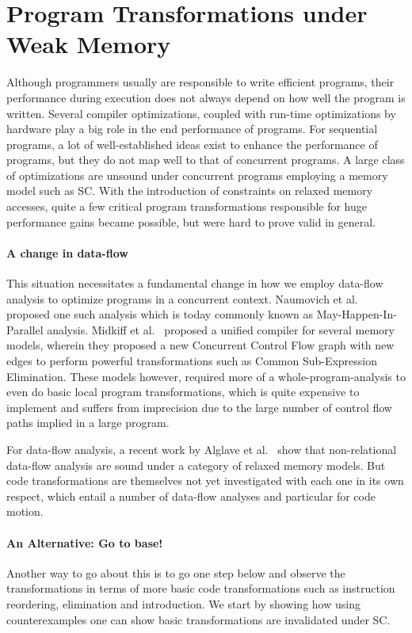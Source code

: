 \section{Program Transformations under Weak Memory}

    Although programmers usually are responsible to write efficient programs, their performance during execution does not always depend on how well the program is written. 
    Several compiler optimizations, coupled with run-time optimizations by hardware play a big role in the end performance of programs.
    For sequential programs, a lot of well-established ideas exist to enhance the performance of programs, but they do not map well to that of concurrent programs. 
    A large class of optimizations are unsound under concurrent programs employing a memory model such as SC.
    With the introduction of constraints on relaxed memory accesses, quite a few critical program transformations responsible for huge performance gains became possible, but were hard to prove valid in general. 

    \paragraph{A change in data-flow} 
    This situation necessitates a fundamental change in how we employ data-flow analysis to optimize programs in a concurrent context. Naumovich et al.~\cite{NaumovichA} proposed one such analysis which is today commonly known as May-Happen-In-Parallel analysis. 
    Midkiff et al.~\cite{Midkiff} proposed a unified compiler for several memory models, wherein they proposed a new Concurrent Control Flow graph with new edges to perform powerful transformations such as Common Sub-Expression Elimination. 
    These models however, required more of a whole-program-analysis to even do basic local program transformations, which is quite expensive to implement and suffers from imprecision due to the large number of control flow paths implied in a large program. 

    For data-flow analysis, a recent work by Alglave et al.~\cite{Alglave2} show that non-relational data-flow analysis are sound under a category of relaxed memory models. 
    But code transformations are themselves not yet investigated with each one in its own respect, which entail a number of data-flow analyses and particular for code motion.
    
    \paragraph{An Alternative: Go to base!}
    Another way to go about this is to go one step below and observe the transformations in terms of more basic code transformations such as instruction reordering, elimination and introduction.   
    We start by showing how using counterexamples one can show basic transformations are invalidated under SC.

